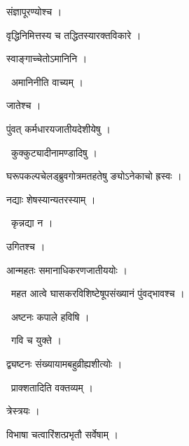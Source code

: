 \documentclass[10pt, openany, oneside]{book}
\begin{document}
\noindent संज्ञापूरण्योश्च ।

\noindent वृद्धिनिमित्तस्य च तद्धितस्यारक्तविकारे ।

\noindent स्वाङ्गाच्चेतोऽमानिनि ।

\par\noindent\hspace{1.5em}{\vps वा॰}~{\qt अमानिनीति वाच्यम् ।}

\noindent जातेश्च ।

\noindent पुंवत् कर्मधारयजातीयदेशीयेषु ।

\par\noindent\hspace{1.5em}{\vps वा॰}~{\qt कुक्कुट्यादीनामण्डादिषु ।}

\noindent घरूपकल्पचेलड्ब्रुवगोत्रमतहतेषु ङ्योऽनेकाचो ह्रस्वः ।

\noindent नद्याः शेषस्यान्यतरस्याम् ।

\par\noindent\hspace{1.5em}{\vps वा॰}~{\qt कृन्नद्या न ।}

\noindent उगितश्च ।

\noindent आन्महतः समानाधिकरणजातीययोः ।

\par\noindent\hspace{1.5em}{\vps वा॰}~{\qt महत आत्वे घासकरविशिष्टेषूपसंख्यानं पुंवद्भावश्च ।}

\par\noindent\hspace{1.5em}{\vps वा॰}~{\qt अष्टनः कपाले हविषि ।}

\par\noindent\hspace{1.5em}{\vps वा॰}~{\qt गवि च युक्ते ।}

\noindent द्व्यष्टनः संख्यायामबहुव्रीह्यशीत्योः ।

\par\noindent\hspace{1.5em}{\vps वा॰}~{\qt प्राक्शतादिति वक्तव्यम् ।}

\noindent त्रेस्त्रयः ।

\noindent विभाषा चत्वारिंशत्प्रभृतौ सर्वेषाम् ।
\end{document}
